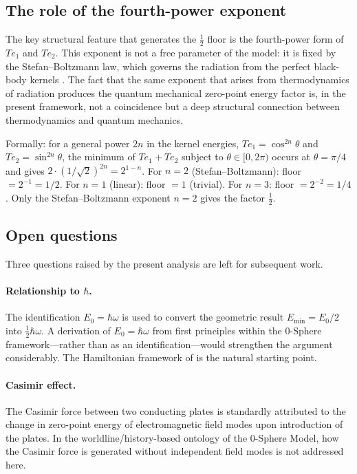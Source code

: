 \documentclass[%
 reprint, amsmath,amssymb, aps, prb, ]{revtex4-2}
\numberwithin{equation}{section}
\begin{document}
\subsection{The role of the fourth-power exponent}

The key structural feature that generates the $\tfrac{1}{2}$ floor is the fourth-power form of $Te_1$ and $Te_2$. This exponent is not a free parameter of the model: it is fixed by the Stefan--Boltzmann law, which governs the radiation from the perfect black-body kernels \cite{hanamura2018}. The fact that the same exponent that arises from thermodynamics of radiation produces the quantum mechanical zero-point energy factor is, in the present framework, not a coincidence but a deep structural connection between thermodynamics and quantum mechanics.

Formally: for a general power $2n$ in the kernel energies, $Te_1 = \cos^{2n}\theta$ and $Te_2 = \sin^{2n}\theta$, the minimum of $Te_1 + Te_2$ subject to $\theta \in [0, 2\pi)$ occurs at $\theta = \pi/4$ and gives $2 \cdot (1/\sqrt{2})^{2n} = 2^{1-n}$. For $n = 2$ (Stefan--Boltzmann): floor $= 2^{-1} = 1/2$. For $n = 1$ (linear): floor $= 1$ (trivial). For $n = 3$: floor $= 2^{-2} = 1/4$. Only the Stefan--Boltzmann exponent $n = 2$ gives the factor $\tfrac{1}{2}$.

\subsection{Open questions}

Three questions raised by the present analysis are left for subsequent work.

\paragraph{Relationship to $\hbar$.} The identification $E_0 = \hbar\omega$ is used to convert the geometric result $E_\text{min} = E_0/2$ into $\tfrac{1}{2}\hbar\omega$. A derivation of $E_0 = \hbar\omega$ from first principles within the 0-Sphere framework---rather than as an identification---would strengthen the argument considerably. The Hamiltonian framework of \cite{hanamura2025_18} is the natural starting point.

\paragraph{Casimir effect.} The Casimir force between two conducting plates is standardly attributed to the change in zero-point energy of electromagnetic field modes upon introduction of the plates. In the worldline/history-based ontology of the 0-Sphere Model, how the Casimir force is generated without independent field modes is not addressed here.
\end{document}
